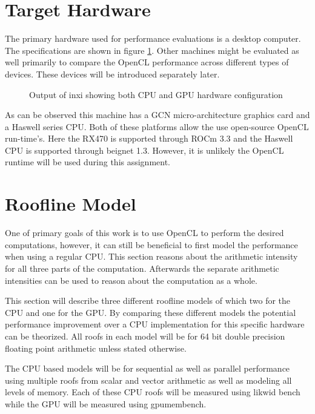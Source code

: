 \documentclass[conference]{IEEEtran}
\newcommand\bashstyle{
	\lstset{
		language=Bash,
		basicstyle=\ttm,
		showstringspaces=false,
		tabsize=2,
		aboveskip=0.2cm,
		belowskip=0.2cm,
		prebreak=\textbackslash,
		extendedchars=true,
		mathescape=false,
		linewidth=8.85cm,
		breaklines=true
	}
}
\newcommand\bashexternal[2][]{{\bashstyle}}
\begin{document}
\section{Target Hardware}

The primary hardware used for performance evaluations is a desktop computer.
The specifications are shown in figure \ref{fig:inxihardware}. Other machines
might be evaluated as well primarily to compare the OpenCL performance across
different types of devices. These devices will be introduced separately later.

\begin{center}
	\begin{figure}[H]
		\bashexternal{resources/bash/inxi.sh}
		\captionsetup{justification=centering}
		\caption{Output of inxi showing both CPU and GPU hardware configuration}
		\label{fig:inxihardware}
	\end{figure}
\end{center}

As can be observed this machine has a GCN micro-architecture graphics card
and a Haswell series CPU. Both of these platforms allow the use open-source
OpenCL run-time's. Here the RX470 is supported through ROCm\cite{rocm} 3.3 and
the Haswell CPU is supported through beignet\cite{beignet} 1.3. However, it is
unlikely the OpenCL runtime will be used during this assignment.

\section{Roofline Model}

One of primary goals of this work is to use OpenCL to perform the desired
computations, however, it can still be beneficial to first model the
performance when using a regular CPU. This section reasons about the
arithmetic intensity for all three parts of the computation. Afterwards the
separate arithmetic intensities can be used to reason about the computation as
a whole.

This section will describe three different roofline models of which two for the
CPU and one for the GPU. By comparing these different models the potential
performance improvement over a CPU implementation for this specific hardware
can be theorized. All roofs in each model will be for 64 bit double precision
floating point arithmetic unless stated otherwise.

The CPU based models will be for sequential as well as parallel performance
using multiple roofs from scalar and vector arithmetic as well as modeling all
levels of memory. Each of these CPU roofs will be measured using
likwid bench\cite{likwid-bench} while the GPU will be measured using
gpumembench\cite{gpumembench}.
\end{document}
